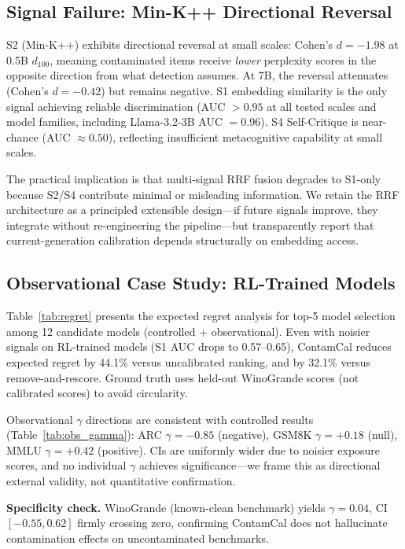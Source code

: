 \documentclass[11pt,a4paper]{article}
\begin{document}
\subsection{Signal Failure: Min-K++ Directional Reversal}
\label{sec:signal_ablation}

S2 (Min-K++) exhibits directional reversal at small scales: Cohen's $d = -1.98$ at 0.5B $d_{100}$, meaning contaminated items receive \emph{lower} perplexity scores in the opposite direction from what detection assumes. At 7B, the reversal attenuates (Cohen's $d = -0.42$) but remains negative. S1 embedding similarity is the only signal achieving reliable discrimination (AUC $> 0.95$ at all tested scales and model families, including Llama-3.2-3B AUC $= 0.96$). S4 Self-Critique is near-chance (AUC $\approx 0.50$), reflecting insufficient metacognitive capability at small scales.

The practical implication is that multi-signal RRF fusion degrades to S1-only because S2/S4 contribute minimal or misleading information. We retain the RRF architecture as a principled extensible design---if future signals improve, they integrate without re-engineering the pipeline---but transparently report that current-generation calibration depends structurally on embedding access.

\subsection{Observational Case Study: RL-Trained Models}
\label{sec:observational}

Table~\ref{tab:regret} presents the expected regret analysis for top-5 model selection among 12 candidate models (controlled + observational). Even with noisier signals on RL-trained models (S1 AUC drops to 0.57--0.65), ContamCal reduces expected regret by 44.1\% versus uncalibrated ranking, and by 32.1\% versus remove-and-rescore. Ground truth uses held-out WinoGrande scores (not calibrated scores) to avoid circularity.

Observational $\gamma$ directions are consistent with controlled results (Table~\ref{tab:obs_gamma}): ARC $\gamma = -0.85$ (negative), GSM8K $\gamma = +0.18$ (null), MMLU $\gamma = +0.42$ (positive). CIs are uniformly wider due to noisier exposure scores, and no individual $\gamma$ achieves significance---we frame this as directional external validity, not quantitative confirmation.

\textbf{Specificity check.} WinoGrande (known-clean benchmark) yields $\gamma = 0.04$, CI $[-0.55, 0.62]$ firmly crossing zero, confirming ContamCal does not hallucinate contamination effects on uncontaminated benchmarks.
\end{document}

